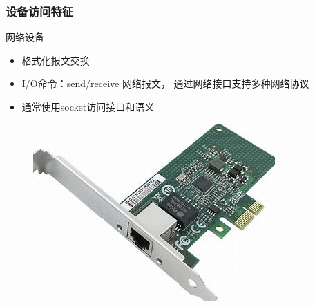 % 
\begin{frame}[fragile]
    \frametitle{设备访问特征}
    网络设备
    \begin{itemize}
        \item 格式化报文交换
        \item I/O命令：send/receive 网络报文， 通过网络接口支持多种网络协议
        \item 通常使用socket访问接口和语义
    \end{itemize}
    \begin{figure}
        \includegraphics[width=0.3\linewidth]{figs/net-dev.png}
    \end{figure}
\end{frame}

